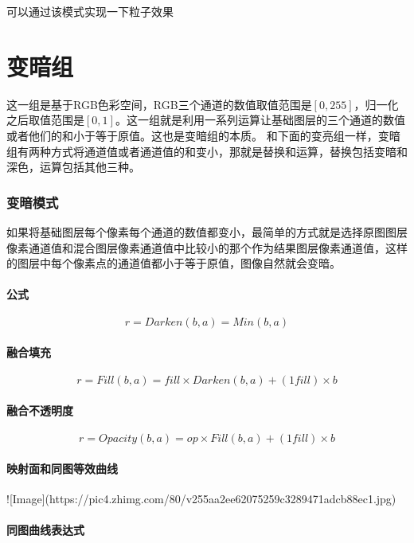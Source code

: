 可以通过该模式实现一下粒子效果

\chapter{变暗组}

这一组是基于RGB色彩空间，RGB三个通道的数值取值范围是$[0,255]$，归一化之后取值范围是$[0,1]$。这一组就是利用一系列运算让基础图层的三个通道的数值或者他们的和小于等于原值。这也是变暗组的本质。
和下面的变亮组一样，变暗组有两种方式将通道值或者通道值的和变小，那就是替换和运算，替换包括变暗和深色，运算包括其他三种。

\subsection{ 变暗模式}

如果将基础图层每个像素每个通道的数值都变小，最简单的方式就是选择原图图层像素通道值和混合图层像素通道值中比较小的那个作为结果图层像素通道值，这样的图层中每个像素点的通道值都小于等于原值，图像自然就会变暗。

\subsubsection{ 公式}

$$r=Darken(b,a)=Min(b,a)$$

\subsubsection{ 融合填充}

$$r= Fill(b,a) =fill\times Darken(b,a)+(1fill)\times b$$

\subsubsection{ 融合不透明度}

$$r=Opacity(b,a)=op\times Fill(b,a)+(1fill)\times b$$

\subsubsection{ 映射面和同图等效曲线}

![Image](https://pic4.zhimg.com/80/v255aa2ee62075259c3289471adcb88ec1.jpg)

\subsubsection{ 同图曲线表达式}

